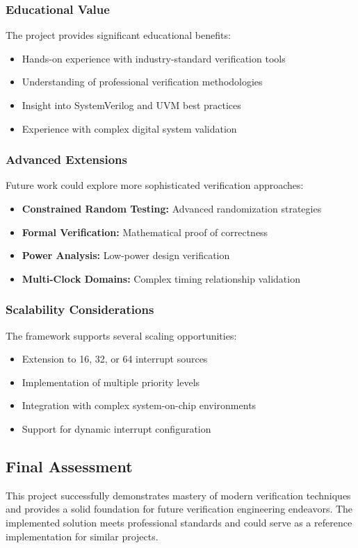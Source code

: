 \documentclass[12pt,a4paper]{article}
\begin{document}
\subsubsection{Educational Value}
The project provides significant educational benefits:
\begin{itemize}
    \item Hands-on experience with industry-standard verification tools
    \item Understanding of professional verification methodologies
    \item Insight into SystemVerilog and UVM best practices
    \item Experience with complex digital system validation
\end{itemize}



\subsubsection{Advanced Extensions}
Future work could explore more sophisticated verification approaches:
\begin{itemize}
    \item \textbf{Constrained Random Testing:} Advanced randomization strategies
    \item \textbf{Formal Verification:} Mathematical proof of correctness
    \item \textbf{Power Analysis:} Low-power design verification
    \item \textbf{Multi-Clock Domains:} Complex timing relationship validation
\end{itemize}

\subsubsection{Scalability Considerations}
The framework supports several scaling opportunities:
\begin{itemize}
    \item Extension to 16, 32, or 64 interrupt sources
    \item Implementation of multiple priority levels
    \item Integration with complex system-on-chip environments
    \item Support for dynamic interrupt configuration
\end{itemize}

\subsection{Final Assessment}
This project successfully demonstrates mastery of modern verification techniques and provides a solid foundation for future verification engineering endeavors. The implemented solution meets professional standards and could serve as a reference implementation for similar projects.
\end{document}
